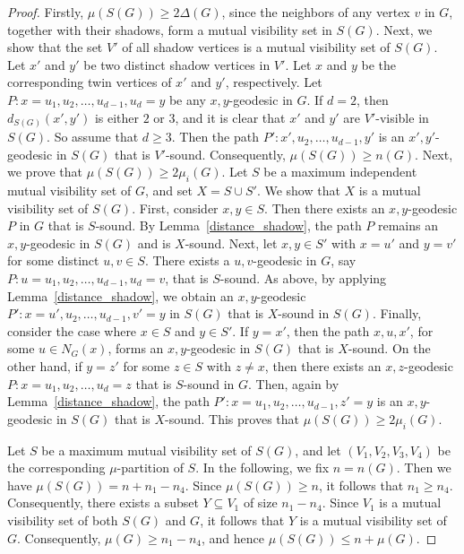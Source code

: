 \documentclass[a4paper,12pt]{article}
\begin{document}
{\begin{proof}
Firstly, $\mu(S(G)) \geq 2\Delta(G)$, since the neighbors of any vertex $v$ in $G$, together with their shadows, form a mutual visibility set in $S(G)$.
 Next, we show that the set $V'$ of all shadow vertices is a mutual visibility set of $S(G)$. Let $x'$ and $y'$ be two distinct shadow vertices in $V'$. Let $x$ and $y$ be the corresponding twin vertices of $x'$ and $y'$, respectively.
Let $P: x = u_1, u_2, \dots, u_{d-1}, u_d = y$ be any $x,y$-geodesic in $G$. If $d = 2$, then $d_{S(G)}(x', y')$ is either $2$ or $3$, and it is clear that $x'$ and $y'$ are $V'$-visible in $S(G)$.
So assume that $d \geq 3$. Then the path $P' : x', u_2, \dots, u_{d-1}, y'$ is an $x',y'$-geodesic in $S(G)$ that is $V'$-sound. Consequently, $\mu(S(G)) \geq n(G)$.
 Next, we prove that $\mu(S(G)) \geq 2\mu_i(G)$. Let $S$ be a maximum independent mutual visibility set of $G$, and set $X = S \cup S'$. We show that $X$ is a mutual visibility set of $S(G)$. First, consider $x,y \in S$. Then there exists an $x,y$-geodesic $P$ in $G$ that is $S$-sound. By Lemma~\ref{distance_shadow}, the path $P$ remains an $x,y$-geodesic in $S(G)$ and is $X$-sound. Next, let $x,y \in S'$ with $x = u'$ and $y = v'$ for some distinct $u,v \in S$. There exists a $u,v$-geodesic in $G$, say $P: u = u_1, u_2, \dots, u_{d-1}, u_d = v$, that is $S$-sound.
As above, by applying Lemma~\ref{distance_shadow}, we obtain an $x,y$-geodesic
$P' : x = u', u_2, \dots, u_{d-1}, v' = y$ in $S(G)$ that is $X$-sound in $S(G)$.
Finally, consider the case where $x \in S$ and $y \in S'$. If $y = x'$, then the
path $x, u, x'$, for some $u \in N_G(x)$, forms an $x,y$-geodesic in $S(G)$ that
is $X$-sound.
On the other hand, if $y = z'$ for some $z \in S$ with $z \neq x$, then there exists an $x,z$-geodesic
$P: x = u_1, u_2, \dots, u_d = z$ that is $S$-sound in $G$. Then, again by Lemma~\ref{distance_shadow}, the path
$P': x = u_1, u_2, \dots, u_{d-1}, z' = y$ is an $x,y$-geodesic in $S(G)$ that is $X$-sound. This proves that
$\mu(S(G)) \geq 2\mu_i(G)$.

Let $S$ be a maximum mutual visibility set of $S(G)$, and let $(V_1, V_2, V_3, V_4)$ be the corresponding $\mu$-partition of $S$. In the following, we fix $n = n(G)$. Then we have $\mu(S(G)) = n + n_1 - n_4$. Since $\mu(S(G)) \geq n$, it follows that $n_1 \geq n_4$. Consequently, there exists a subset $Y \subseteq V_1$ of size $n_1 - n_4$. Since $V_1$ is a mutual visibility set of both $S(G)$ and $G$, it follows that $Y$ is a mutual visibility set of $G$. Consequently, $\mu(G) \geq n_1 - n_4$, and hence $\mu(S(G)) \leq n + \mu(G)$.


\end{proof}}
\end{document}
